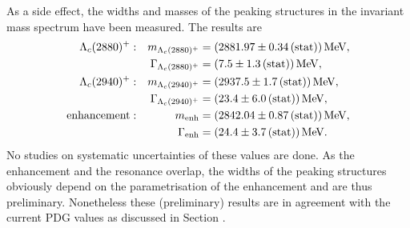 As a side effect, the widths and masses of the peaking structures in the invariant \Dz\proton mass spectrum have been measured.
The results are
\begin{align*}
    {\ensuremath{\Lambda}}_{c}(2880)^+:            && m_{{\Lambda}_{c}(2880)^+}         &= (2881.97 \pm 0.34\mathrm{\,(stat)}) \mathrm{\,Me\kern -0.1em V}, \\
                        && \Gamma_{{\Lambda}_{c}(2880)^+}    &= (7.5 \pm 1.3\mathrm{\,(stat)}) \mathrm{\,Me\kern -0.1em V}, \\
    {\Lambda}_{c}(2940)^+:           && m_{{\Lambda}_{c}(2940)^+}        &= (2937.5 \pm 1.7\mathrm{\,(stat)}) \mathrm{\,Me\kern -0.1em V}, \\
                        && \Gamma_{{\Lambda}_{c}(2940)^+}   &= (23.4 \pm 6.0\mathrm{\,(stat)}) \mathrm{\,Me\kern -0.1em V}, \\
    \text{enhancement}: && m_{\text{enh}}      &= (2842.04 \pm 0.87\mathrm{\,(stat)}) \mathrm{\,Me\kern -0.1em V}, \\
                        && \Gamma_{\text{enh}} &= (24.4 \pm 3.7\mathrm{\,(stat)}) \mathrm{\,Me\kern -0.1em V}.
\end{align*}
No studies on systematic uncertainties of these values are done.
As the enhancement and the \LcResI resonance overlap, the widths of the peaking structures obviously depend on the parametrisation of the enhancement and are thus preliminary.
Nonetheless these (preliminary) results are in agreement with the current PDG values as discussed in Section \label{sec:Signalyield_D0p}.
